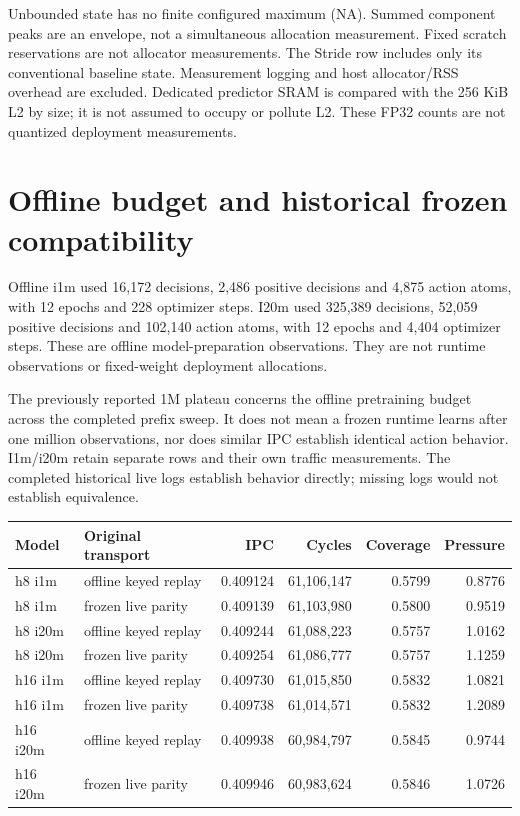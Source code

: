 \documentclass[10pt]{article}
\begin{document}
Unbounded state has no finite configured maximum (NA). Summed component peaks are an envelope, not a simultaneous allocation measurement. Fixed scratch reservations are not allocator measurements. The Stride row includes only its conventional baseline state. Measurement logging and host allocator/RSS overhead are excluded. Dedicated predictor SRAM is compared with the 256 KiB L2 by size; it is not assumed to occupy or pollute L2. These FP32 counts are not quantized deployment measurements.

\clearpage\section{Offline budget and historical frozen compatibility}

Offline i1m used 16,172 decisions, 2,486 positive decisions and 4,875 action atoms, with 12 epochs and 228 optimizer steps. I20m used 325,389 decisions, 52,059 positive decisions and 102,140 action atoms, with 12 epochs and 4,404 optimizer steps. These are offline model-preparation observations. They are not runtime observations or fixed-weight deployment allocations.

The previously reported 1M plateau concerns the offline pretraining budget across the completed prefix sweep. It does not mean a frozen runtime learns after one million observations, nor does similar IPC establish identical action behavior. I1m/i20m retain separate rows and their own traffic measurements. The completed historical live logs establish behavior directly; missing logs would not establish equivalence.

\begin{center}
\scriptsize
\begin{tabular}{llrrrr}
\toprule
Model & Original transport & IPC & Cycles & Coverage & Pressure \\
\midrule
h8 i1m & offline keyed replay & 0.409124 & 61,106,147 & 0.5799 & 0.8776 \\
h8 i1m & frozen live parity & 0.409139 & 61,103,980 & 0.5800 & 0.9519 \\
h8 i20m & offline keyed replay & 0.409244 & 61,088,223 & 0.5757 & 1.0162 \\
h8 i20m & frozen live parity & 0.409254 & 61,086,777 & 0.5757 & 1.1259 \\
h16 i1m & offline keyed replay & 0.409730 & 61,015,850 & 0.5832 & 1.0821 \\
h16 i1m & frozen live parity & 0.409738 & 61,014,571 & 0.5832 & 1.2089 \\
h16 i20m & offline keyed replay & 0.409938 & 60,984,797 & 0.5845 & 0.9744 \\
h16 i20m & frozen live parity & 0.409946 & 60,983,624 & 0.5846 & 1.0726 \\
\bottomrule
\end{tabular}
\end{center}
\end{document}
